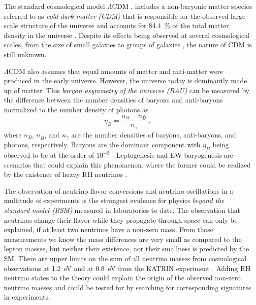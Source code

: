 The standard cosmological model $\Lambda$CDM , includes a non-baryonic matter species referred to as \textit{cold dark matter (CDM)} that is responsible for the observed large-scale structure of the universe and accounts for \SI{84.4}{\percent} of the total matter density in the universe . Despite its effects being observed at several cosmological scales, from the size of small galaxies  to groups of galaxies , the nature of CDM is still unknown.

$\Lambda$CDM also assumes that equal amounts of matter and anti-matter were produced in the early universe. However, the universe today is dominantly made up of matter. This \textit{baryon asymmetry of the universe (BAU)} can be measured by the difference between the number densities of baryons and anti-baryons normalized to the number density of photons as
\begin{equation}
    \eta_B = \frac{n_B - n_{\bar{B}}}{n_\gamma}
    \;,
\end{equation}
where $n_B$, $n_{\bar{B}}$, and $n_\gamma$ are the number densities of baryons, anti-baryons, and photons, respectively. Baryons are the dominant component with  $\eta_B$ being observed to be at the order of $10^{-9}$ \cite{PDG_review_2022}. Leptogenesis and EW baryogenesis are scenarios that could explain this phenomenon, where the former could be realized by the existence of heavy RH neutrinos .

The observation of neutrino flavor conversions and neutrino oscillations in a multitude of experiments  is the strongest evidence for physics \textit{beyond the standard model (BSM)} measured in laboratories to date. The observation that neutrinos change their flavor while they propagate through space can only be explained, if at least two neutrinos have a non-zero mass. From those measurements we know the mass differences are very small as compared to the lepton masses, but neither their existence, nor their smallness is predicted by the SM. There are upper limits on the sum of all neutrino masses from cosmological observations at \SI{1.2}{\electronvolt}  and at \SI{0.8}{\electronvolt} from the KATRIN experiment . Adding RH neutrino states to the theory could explain the origin of the observed non-zero neutrino masses and could be tested for by searching for corresponding signatures in experiments.


